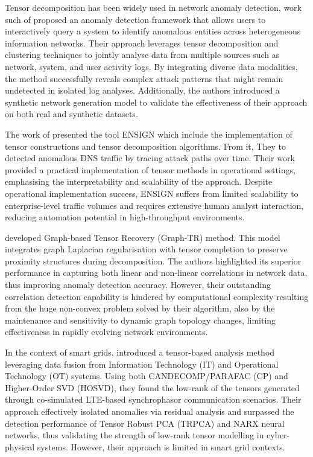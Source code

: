 \documentclass[preprint,12pt,authoryear]{elsarticle}
\begin{document}
Tensor decomposition has been widely used in network anomaly detection, work such of \cite{ranjbar2018qanet} proposed an anomaly detection framework that allows users to interactively query a system to identify anomalous entities across heterogeneous information networks. Their approach leverages tensor decomposition and clustering techniques to jointly analyse data from multiple sources such as network, system, and user activity logs. By integrating diverse data modalities, the method successfully reveals complex attack patterns that might remain undetected in isolated log analyses. Additionally, the authors introduced a synthetic network generation model to validate the effectiveness of their approach on both real and synthetic datasets.


The work of \cite{bruns2016ensign} presented the tool ENSIGN which include the implementation of tensor constructions and tensor decomposition algorithms. From it, They to detected anomalous DNS traffic by tracing attack paths over time. Their work provided a practical implementation of tensor methods in operational settings, emphasising the interpretability and scalability of the approach. Despite operational implementation success, ENSIGN suffers from limited scalability to enterprise-level traffic volumes and requires extensive human analyst interaction, reducing automation potential in high-throughput environments.


\cite{xie2018graph} developed Graph-based Tensor Recovery (Graph-TR) method. This model integrates graph Laplacian regularisation with tensor completion to preserve proximity structures during decomposition. The authors highlighted its superior performance in capturing both linear and non-linear correlations in network data, thus improving anomaly detection accuracy. However, their outstanding correlation detection capability is hindered by computational complexity resulting from the huge non-convex problem solved by their algorithm, also by the maintenance and sensitivity to dynamic graph topology changes, limiting effectiveness in rapidly evolving network environments.

In the context of smart grids, \cite{jafarigiv2023tensor} introduced a tensor-based analysis method leveraging data fusion from Information Technology (IT) and Operational Technology (OT) systems. Using both CANDECOMP/PARAFAC (CP) and Higher-Order SVD (HOSVD), they found the low-rank of the tensors generated through co-simulated LTE-based synchrophasor communication scenarios. Their approach effectively isolated anomalies via residual analysis and surpassed the detection performance of Tensor Robust PCA (TRPCA) and NARX neural networks, thus validating the strength of low-rank tensor modelling in cyber-physical systems. However, their approach is limited in smart grid contexts.
\end{document}
